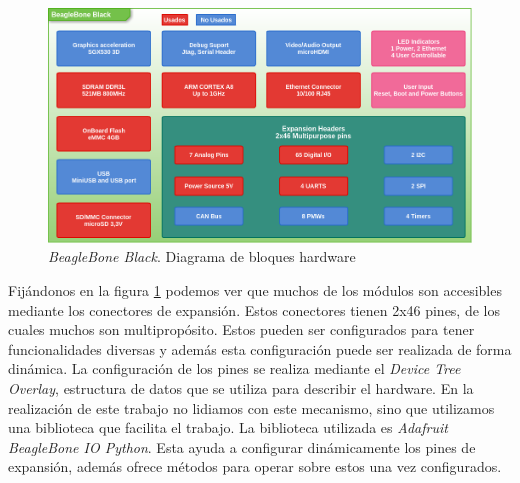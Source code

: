 	\begin{figure}[h]
		\centering
		\includegraphics[keepaspectratio, width=1\textwidth]{./img/beaglebone.png}
		\caption{\emph{BeagleBone Black}. Diagrama de bloques hardware}
		\label{fig:beaglebone}
	\end{figure}
	\par
	Fijándonos en la figura \ref{fig:beaglebone} podemos ver que muchos de los módulos son accesibles mediante los conectores de
	expansión\cite{BeagleWikiExp}. Estos conectores tienen 2x46 pines, de los cuales muchos son multipropósito. Estos pueden ser configurados para tener
	funcionalidades diversas y además esta configuración puede ser realizada de forma dinámica. La configuración de los pines se realiza mediante
	el \emph{Device Tree Overlay}, estructura de datos que se utiliza para describir el hardware. En la realización de este trabajo no lidiamos
	con este mecanismo, sino que utilizamos una biblioteca que facilita el trabajo. La biblioteca utilizada es \emph{Adafruit BeagleBone IO
	Python}\cite{AdaFruitGit}. Esta ayuda a configurar dinámicamente los pines de expansión, además ofrece métodos para
	operar sobre estos una vez configurados.

